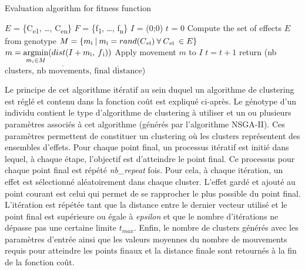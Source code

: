\documentclass{llncs}
\newcommand{\textoverline}[1]{$\overline{\mbox{#1}}$}
\begin{document}
      \begin{algorithm}[H]
      \caption{Evaluation algorithm for fitness function}\label{euclid}
        \begin{algorithmic}[1]
          \State $E$ = \{C\textsubscript{e1}, \dots, C\textsubscript{en}\} 
          \State $F$ = \{f\textsubscript{1}, \dots, f\textsubscript{n}\} 
          \State $I$ = (0;0) 
          \State $t$ = 0 
          \State Compute the set of effects $E$ from genotype
                  \State $M = \{ m\textsubscript{i}\:|\:m\textsubscript{i} = rand(C\textsubscript{ei})\:\forall\:C\textsubscript{ei}\:\in E\}$
                  \State $m = \operatornamewithlimits{argmin}\limits_{m_i \in M}(dist(I+m\textsubscript{i},\:f\textsubscript{i}))$
                  \State Apply movement $m$ to $I$
                  \State $t = t + 1$
                \EndWhile
              \EndFor
            \EndFor
            \State return (nb clusters, \textoverline{nb movements}, \textoverline{final distance})
        \end{algorithmic}
      \end{algorithm}

Le principe de cet algorithme itératif au sein duquel un algorithme de clustering est réglé et contenu dans la fonction coût est expliqué ci-après.
Le génotype d'un individu contient le type d'algorithme de clustering à utiliser et un ou plusieurs paramètres associés à cet algorithme (générés par l'algorithme NSGA-II).
Ces paramètres permettent de constituer un clustering où les clusters représentent des ensembles d'effets.
Pour chaque point final, un processus itératif est initié dans lequel, à chaque étape, l'objectif est d'atteindre le point final.
Ce processus pour chaque point final est répété \textit{nb\_repeat} fois.
Pour cela, à chaque itération, un effet est sélectionné aléatoirement dans chaque cluster.
L'effet gardé et ajouté au point courant est celui qui permet de se rapprocher le plus possible du point final.
L'itération est répétée tant que la distance entre le dernier vecteur utilisé et le point final est supérieure ou égale à \textit{epsilon} et que le nombre d'itérations ne dépasse pas une certaine limite $t_{max}$.
Enfin, le nombre de clusters générés avec les paramètres d'entrée ainsi que les valeurs moyennes du nombre de mouvements requis pour atteindre les points finaux et la distance finale sont retournés à la fin de la fonction coût.
\end{document}
